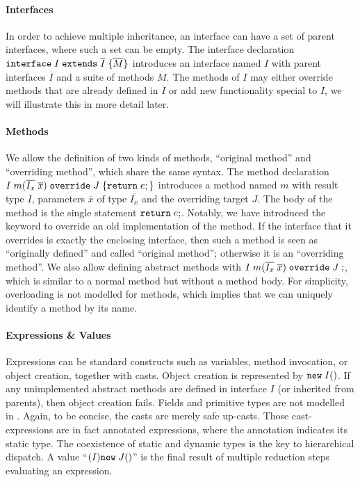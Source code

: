 \paragraph{Interfaces}
In order to achieve multiple inheritance, an interface can have a set of 
parent interfaces, where such a set can be empty. The interface declaration $\texttt{interface} \; I \; \texttt{extends} \; \overline{I} \; {\{} \overline{M} {\}}$ introduces an interface named $I$ with parent interfaces $\overline{I}$ and a suite of methods $\overline{M}$. The methods of $I$ may either override methods that are already defined in $\overline{I}$ or add new functionality special to $I$, we will illustrate this in more detail later.

\paragraph{Methods}
We allow the definition of two kinds of methods, ``original method'' and ``overriding method'', which share the same syntax. The method declaration $I \; m (\overline{I_x} \; \overline{x}) \; \texttt{override} \; J \; {\{} \texttt{return} \; e ; {\}}$ introduces a
method named $m$ with result type $I$, parameters $\overline{x}$ of
type $\overline{I_x}$ and the overriding target $J$. The body of the
method is the single statement $ \texttt{return} \; e;$. Notably, we have introduced the
\kwoverride{} keyword to override an old implementation of the
method. If the interface that it overrides is exactly the enclosing
interface, then such a method is seen as ``originally defined'' and called ``original method''; otherwise it is an ``overriding method''. We also allow
defining abstract methods with $I \; m (\overline{I_x} \; \overline{x}) \; \texttt{override} \; J \; ;$, which is
similar to a normal method but without a method body. 
For simplicity, overloading is not modelled for methods, which
implies that we can uniquely identify a method by its name.

\paragraph{Expressions \& Values}
Expressions can be standard constructs such as variables, method
invocation, or object creation, together with casts. 
Object creation is represented by $\texttt{new} \; I()$. If any unimplemented abstract methods are defined in interface $I$ (or inherited from parents), then object creation fails. Fields and primitive types are not modelled in \MIM{}. 
Again, to be concise, the casts are merely safe up-casts. Those cast-expressions
are in fact annotated expressions, where the annotation indicates its static type.
The coexistence of static and dynamic types is the key to hierarchical dispatch.
A value
``$(I)\texttt{new} \; J()$''
is the final result of multiple reduction steps evaluating an
expression.

